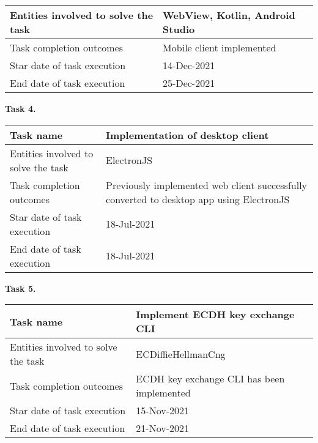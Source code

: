 \begin{description}
\begin{tabular}{|p{}|p{}|}
        \hline
        Entities involved to solve the task & WebView, Kotlin, Android Studio     \\
        \hline
        Task completion outcomes            & Mobile client implemented           \\
        \hline
        Star date of task execution         & 14-Dec-2021                         \\
        \hline
        End date of task execution          & 25-Dec-2021                         \\
        \hline
    \end{tabular}
    \item \hspace*{8mm}\textbf{Task 4.}\\
    \begin{tabular}{|p{}|p{}|}
        \hline
        Task name                           & Implementation of desktop client \\
        \hline
        Entities involved to solve the task & ElectronJS                       \\
        \hline
        Task completion outcomes & Previously implemented web client successfully converted to
        desktop app using ElectronJS \\
        \hline
        Star date of task execution         & 18-Jul-2021                      \\
        \hline
        End date of task execution          & 18-Jul-2021                      \\
        \hline
    \end{tabular}
    \item \hspace*{8mm}\textbf{Task 5.}\\
    \begin{tabular}{|p{}|p{}|}
        \hline
        Task name                           & Implement ECDH key exchange CLI            \\
        \hline
        Entities involved to solve the task & ECDiffieHellmanCng                         \\
        \hline
        Task completion outcomes            & ECDH key exchange CLI has been implemented \\
        \hline
        Star date of task execution         & 15-Nov-2021                                \\
        \hline
        End date of task execution          & 21-Nov-2021                                \\
        \hline
    \end{tabular}
\end{description}